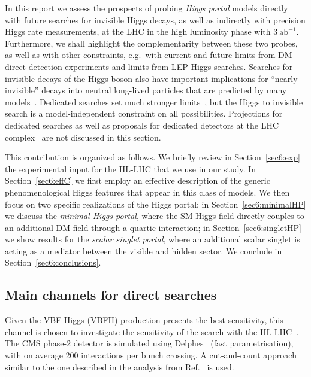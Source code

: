 \documentclass[../report.tex]{subfiles}
\begin{document}
In this report we assess the prospects of probing \emph{Higgs portal} models directly with future searches for invisible Higgs decays, as well as indirectly with precision Higgs rate measurements, at the LHC in the high luminosity phase with $3~\mathrm{ab}^{-1}$. Furthermore, we shall highlight the complementarity between these two probes, as well as with other constraints, e.g.~with current and future limits from DM direct detection experiments and limits from LEP Higgs searches. Searches for invisible decays of the Higgs boson also have important implications for ``nearly invisible'' decays into neutral long-lived particles that are predicted by many models~\cite{Curtin:2018mvb}. Dedicated searches set much stronger limits~\cite{Aad:2015uaa,ATLAS:2016jza,Aaij:2016xmb,CMS:2014hka}, but the Higgs to invisible search is a model-independent constraint on all possibilities.  Projections for dedicated searches as well as proposals for dedicated detectors at the LHC complex~\cite{Chou:2016lxi,Gligorov:2017nwh,Gligorov:2018vkc} are not discussed in this section.

This contribution is organized as follows. We briefly review in Section~\ref{sec6:exp} the experimental input for the HL-LHC that we use in our study. In Section~\ref{sec6:effC} we first employ an effective description of the generic phenomenological Higgs features that appear in this class of models. We then focus on two specific realizations of the Higgs portal: in Section~\ref{sec6:minimalHP} we discuss the \emph{minimal Higgs portal}, where the SM Higgs field directly couples to an additional DM field through a quartic interaction; in Section~\ref{sec6:singletHP} we show results for the \emph{scalar singlet portal}, where an additional scalar singlet is acting as a mediator between the visible and hidden sector. We conclude in Section~\ref{sec6:conclusions}.


\subsection{Main channels for direct searches}\label{sec:expinp}

Given the VBF Higgs (VBFH) production presents the best sensitivity, this channel is chosen to investigate the sensitivity of the search with the HL-LHC~\cite{CMS-PAS-FTR-18-016}. The CMS phase-2 detector is simulated using Delphes~\cite{deFavereau:2013fsa} (fast parametrisation), with on average 200 interactions per bunch crossing.  A
cut-and-count approach similar to the one described in the analysis from Ref.~\cite{Sirunyan:2018owy} is used.
\end{document}
